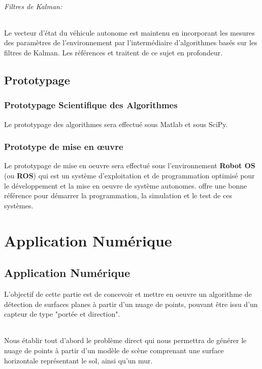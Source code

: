 \documentclass[12pt,a4paper]{report}
\begin{document}
\paragraph{Filtres de Kalman:} Le vecteur d'état du véhicule autonome est maintenu en incorporant les mesures des paramètres de l'environnement par l'intermédiaire d'algorithmes basés sur les filtres de Kalman. Les références \cite{grewal_kalman_2008} et \cite{zarchan_fundamentals_2009} traitent de ce sujet en profondeur.



\chapter{Prototypage}
\section{Prototypage Scientifique des Algorithmes}
Le prototypage des algorithmes sera effectué sous Matlab et sous SciPy.

\section{Prototype de mise en œuvre}

Le prototypage de mise en oeuvre sera effectué sous l'environnement \textbf{Robot OS} (ou \textbf{ROS}) qui est un système d'exploitation et de programmation optimisé pour le développement et la mise en oeuvre de système autonomes. \cite{mahtani_effective_2016} offre une bonne référence pour démarrer la programmation, la simulation et le test de ces systèmes.


\part{Application Numérique}

\chapter{Application Numérique}
L'objectif de cette partie est de concevoir et mettre en oeuvre un algorithme de détection de surfaces planes à partir d'un nuage de points, pouvant être issu d'un capteur de type "portée et direction".

\paragraph{} Nous établir tout d'abord le problème direct qui nous permettra de générer le nuage de points à partir d'un modèle de scène comprenant une surface horizontale représentant le sol, ainsi qu'un mur.
\end{document}
